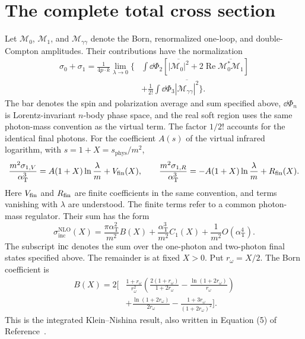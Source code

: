\section{The complete total cross section}
Let $\mathcal M_0$, $\mathcal M_1$, and $\mathcal M_{\gamma\gamma}$
denote the Born, renormalized one-loop, and double-Compton amplitudes.
Their contributions have the normalization
\begin{equation}
 \begin{aligned}
 \sigma_0+\sigma_1=\frac1{4p\cdot k}\lim_{\lambda\to0}\biggl\{&
 \int\dd\Phi_2\left[\overline{|\mathcal M_0|^2}
       +2\operatorname{Re}\overline{\mathcal M_0^*\mathcal M_1}\right]\\
 &+\frac1{2!}\int\dd\Phi_3\overline{|\mathcal M_{\gamma\gamma}|^2}
 \biggr\}.
 \end{aligned}
\end{equation}
The bar denotes the spin and polarization average and sum specified
above, $\dd\Phi_n$ is Lorentz-invariant $n$-body phase space, and the
real soft region uses the same photon-mass convention as the virtual
term. The factor $1/2!$ accounts for the identical final photons.
For the coefficient $A(s)$ of the virtual infrared logarithm, with
$s=1+X=s_{\mathrm{phys}}/m^2$,
\begin{equation}
 \frac{m^2\sigma_{1,V}}{\alpha_{\mathrm T}^3}
 =A(1+X)\ln\frac\lambda m+V_{\rm fin}(X),\qquad
 \frac{m^2\sigma_{1,R}}{\alpha_{\mathrm T}^3}
 =-A(1+X)\ln\frac\lambda m+R_{\rm fin}(X).
\end{equation}
Here $V_{\rm fin}$ and $R_{\rm fin}$ are finite coefficients in the
same convention, and terms vanishing with $\lambda$ are understood.
The finite terms refer to a common photon-mass regulator. Their sum has the form
\begin{equation}
 \boxed{\sigma_{\mathrm{inc}}^{\mathrm{NLO}}(X)
 =\frac{\pi\alpha_{\mathrm T}^2}{m^2}B(X)
  +\frac{\alpha_{\mathrm T}^3}{m^2}C_1(X)
  +\frac1{m^2}O(\alpha_{\mathrm T}^4).}
 \label{eq:comp-overview-total}
\end{equation}
The subscript $\rm inc$ denotes the sum over the one-photon and
two-photon final states specified above. The remainder is at fixed
$X>0$. Put $r_\omega=X/2$. The Born coefficient is
\begin{equation}
 \begin{aligned}
 B(X)=2\bigg[&\frac{1+r_\omega}{r_\omega^2}
 \left(\frac{2(1+r_\omega)}{1+2r_\omega}
       -\frac{\ln(1+2r_\omega)}{r_\omega}\right)\\
 &+\frac{\ln(1+2r_\omega)}{2r_\omega}
       -\frac{1+3r_\omega}{(1+2r_\omega)^2}\bigg].
 \end{aligned}
 \label{eq:comp-overview-born}
\end{equation}
This is the integrated Klein--Nishina result, also written in
Equation (5) of Reference~\cite{qed-processes-lsz}.

